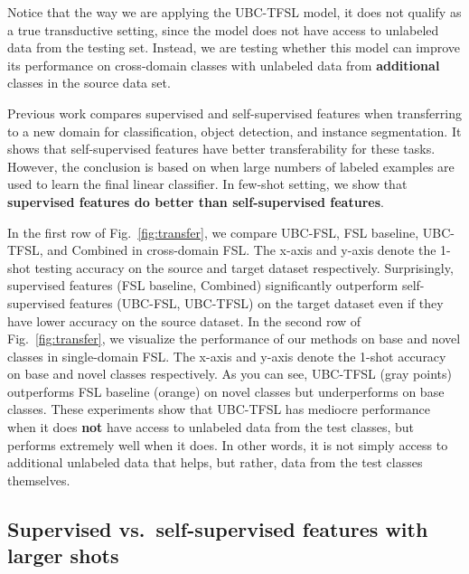 \documentclass[final]{cvpr}
\newcommand{\subsecvspace}{\vspace{-0.0em}}
\begin{document}
Notice that the way we are applying the UBC-TFSL model, it does not qualify as a true transductive setting, since the model does not have access to unlabeled data from the testing set. Instead, we are testing whether this model can improve its performance on cross-domain classes with unlabeled data from \textbf{additional} classes in the source data set. 

Previous work \cite{he2020momentum} compares supervised  and self-supervised features when transferring to a new domain for classification, object detection, and instance segmentation. It shows that self-supervised features have better transferability for these tasks. However, the conclusion is based on when large numbers of labeled examples are used to learn the final linear classifier. In few-shot setting, we show that \textbf{supervised features do better than self-supervised features}.




In the first row of Fig.~\ref{fig:transfer}, we compare UBC-FSL, FSL baseline, UBC-TFSL, and Combined in cross-domain FSL. The x-axis and y-axis denote the 1-shot testing accuracy on the source and target dataset respectively. Surprisingly, supervised features (FSL baseline, Combined) significantly outperform self-supervised features (UBC-FSL, UBC-TFSL) on the target dataset even if they have lower accuracy on the source dataset. In the second row of Fig.~\ref{fig:transfer}, we visualize the performance of our methods on base and novel classes in single-domain FSL. The x-axis and y-axis denote the 1-shot accuracy on base and novel classes respectively. As you can see, UBC-TFSL (gray points) outperforms FSL baseline (orange) on novel classes but underperforms on base classes.
These experiments show that UBC-TFSL has mediocre performance when it does \textbf{not} have access to unlabeled data from the test classes, but performs extremely well when it does. In other words, it is not simply access to additional unlabeled data that helps, but rather, data from the test classes themselves.







\subsecvspace
\subsection{Supervised vs.~self-supervised features with larger shots}
\subsecvspace

\label{shots}
\end{document}
